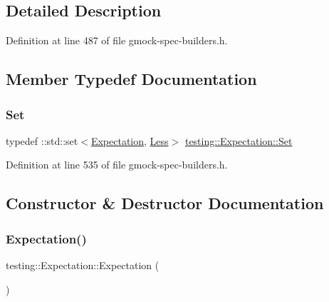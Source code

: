 \subsection{Detailed Description}


Definition at line 487 of file gmock-\/spec-\/builders.\+h.



\subsection{Member Typedef Documentation}
\mbox{\label{classtesting_1_1Expectation_a775955d57763c85daa8fda4b28ee2393}} 
\subsubsection{\texorpdfstring{Set}{Set}}
{\footnotesize\ttfamily typedef \+::std\+::set$<$\hyperlink{classtesting_1_1Expectation}{Expectation}, \hyperlink{classtesting_1_1Expectation_1_1Less}{Less}$>$ \hyperlink{classtesting_1_1Expectation_a775955d57763c85daa8fda4b28ee2393}{testing\+::\+Expectation\+::\+Set}\hspace{0.3cm}{\ttfamily [private]}}



Definition at line 535 of file gmock-\/spec-\/builders.\+h.



\subsection{Constructor \& Destructor Documentation}
\mbox{\label{classtesting_1_1Expectation_a10b4bb1252356ec9224ca93124827184}} 
\subsubsection{\texorpdfstring{Expectation()}{Expectation()}\hspace{0.1cm}{\footnotesize\ttfamily [1/3]}}
{\footnotesize\ttfamily testing\+::\+Expectation\+::\+Expectation (\begin{DoxyParamCaption}{ }\end{DoxyParamCaption})}




